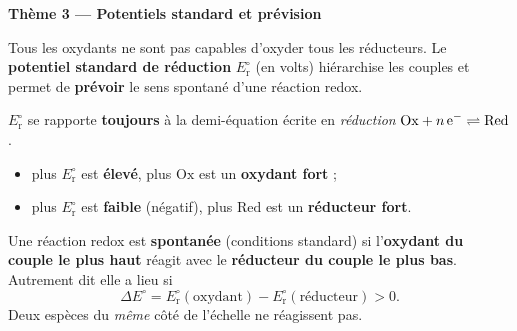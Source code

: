 \documentclass[11pt,a4paper]{article}
\begin{document}
\begin{center}\color{primarydark}\Large\bfseries Thème 3 — Potentiels standard et prévision\end{center}

Tous les oxydants ne sont pas capables d'oxyder tous les réducteurs. Le \textbf{potentiel standard de
réduction} $E_{\mathrm{r}}^{\circ}$ (en volts) hiérarchise les couples et permet de \textbf{prévoir}
le sens spontané d'une réaction redox.

\begin{cle}
$E_{\mathrm{r}}^{\circ}$ se rapporte \textbf{toujours} à la demi-équation écrite en \emph{réduction}
$\mathrm{Ox}+n\,\ce{e^-}\rightleftharpoons\mathrm{Red}$.
\begin{itemize}[leftmargin=1.5em,topsep=1pt,itemsep=0pt]
  \item plus $E_{\mathrm{r}}^{\circ}$ est \textbf{élevé}, plus $\mathrm{Ox}$ est un \textbf{oxydant fort} ;
  \item plus $E_{\mathrm{r}}^{\circ}$ est \textbf{faible} (négatif), plus $\mathrm{Red}$ est un
        \textbf{réducteur fort}.
\end{itemize}
\end{cle}

\begin{cle}
Une réaction redox est \textbf{spontanée} (conditions standard) si l'\textbf{oxydant du couple le
plus haut} réagit avec le \textbf{réducteur du couple le plus bas}. Autrement dit elle a lieu si
\[
\Delta E^{\circ}=E^{\circ}_{\mathrm{r}}(\text{oxydant})-E^{\circ}_{\mathrm{r}}(\text{réducteur})>0.
\]
Deux espèces du \emph{même} côté de l'échelle ne réagissent pas.
\end{cle}

\begin{center}
\end{center}
\end{document}

